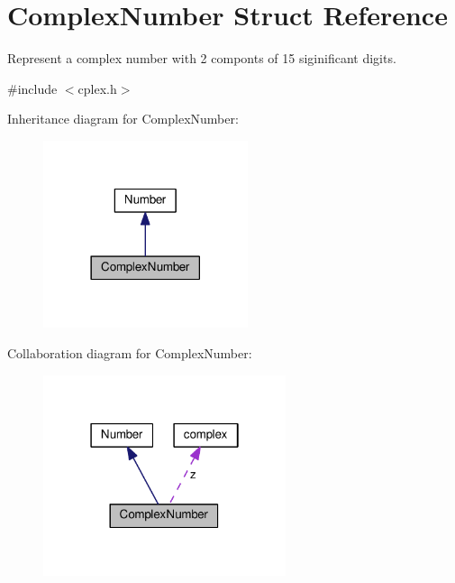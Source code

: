 \hypertarget{structComplexNumber}{}\section{Complex\+Number Struct Reference}
\label{structComplexNumber}


Represent a complex number with 2 componts of 15 siginificant digits.  




{\ttfamily \#include $<$cplex.\+h$>$}



Inheritance diagram for Complex\+Number\+:
\nopagebreak
\begin{figure}[H]
\begin{center}
\leavevmode
\includegraphics[width=170pt]{d8/dea/structComplexNumber__inherit__graph}
\end{center}
\end{figure}


Collaboration diagram for Complex\+Number\+:
\nopagebreak
\begin{figure}[H]
\begin{center}
\leavevmode
\includegraphics[width=202pt]{d1/d07/structComplexNumber__coll__graph}
\end{center}
\end{figure}
